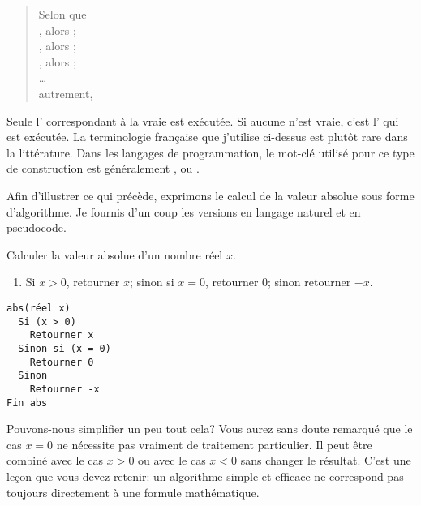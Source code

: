 \begin{itemize}
  \begin{quote}
    Selon que \\
    , alors ; \\
    , alors ; \\
    , alors ; \\
    \dots \\
    autrement, 
  \end{quote}
  Seule l' correspondant à la  vraie est
  exécutée. Si aucune  n'est vraie, c'est
  l' qui est exécutée. La terminologie
  française que j'utilise ci-dessus est plutôt rare dans la
  littérature. Dans les langages de programmation, le mot-clé utilisé
  pour ce type de construction est généralement ,
   ou .
\end{itemize}

Afin d'illustrer ce qui précède, exprimons le calcul de la valeur
absolue sous forme d'algorithme. Je fournis d'un coup les versions en
langage naturel et en pseudocode.

\begin{algorithme}
  \label{algo:algorithmes:abs}
  Calculer la valeur absolue d'un nombre réel $x$.

  \noindent
  \begin{minipage}[t]{0.48\linewidth}
    \begin{enumerate}
    \item Si $x > 0$, retourner $x$; sinon si $x = 0$, retourner $0$;
      sinon retourner $-x$.
    \end{enumerate}
  \end{minipage}
  \hfill
  \begin{minipage}[t]{0.48\linewidth}
    \begin{Schunk}
\begin{Verbatim}
abs(réel x)
  Si (x > 0)
    Retourner x
  Sinon si (x = 0)
    Retourner 0
  Sinon
    Retourner -x
Fin abs
\end{Verbatim}
    \end{Schunk}
  \end{minipage}
\end{algorithme}

Pouvons-nous simplifier un peu tout cela? Vous aurez sans doute
remarqué que le cas $x = 0$ ne nécessite pas vraiment de traitement
particulier. Il peut être combiné avec le cas $x > 0$ ou avec le cas
$x < 0$ sans changer le résultat. C'est une leçon que vous devez
retenir: un algorithme simple et efficace ne correspond pas toujours
directement à une formule mathématique.


